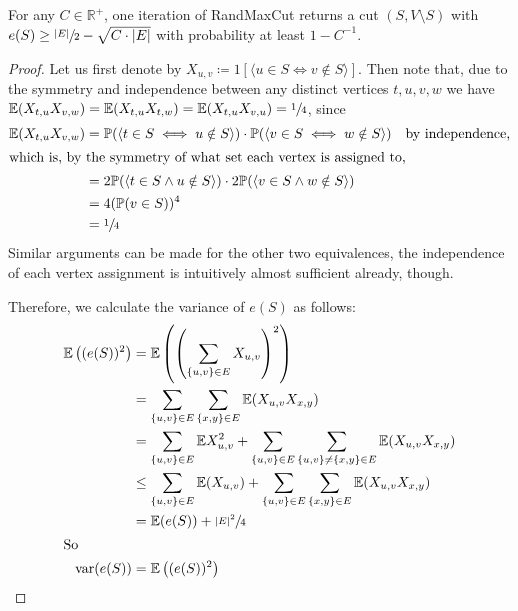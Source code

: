 		\begin{claim}
			For any $C \in \mathbb{R}^+$, one iteration of RandMaxCut returns a cut $(S, V\setminus S)$ with $e(S) \geq 
			\sfrac{|E|}{2} - \sqrt{C\cdot|E|}$ with probability at least $1 - C^{-1}$. 
		\end{claim}
		\begin{proof}
			Let us first denote by $X_{u,v} \coloneqq 1[\langle u \in S \iff v \notin S \rangle]$. Then note that, due 
			to the symmetry and independence between any distinct vertices $t,u,v,w$ we have $\mathbb{E}(X_{t,u}X_{v,w})
			= \mathbb{E}(X_{t,u}X_{t,w}) = \mathbb{E}(X_{t,u}X_{v,u}) = \sfrac{1}{4}$, since 
			\begin{align*}
				\mathbb{E}(X_{t,u}X_{v,w}) &= \mathbb{P}(\langle t \in S \iff u \notin S \rangle) \cdot 
				                           \mathbb{P}(\langle v \in S \iff w \notin S \rangle)&\text{by independence,}\\
						\intertext{which is, by the symmetry of what set each vertex is assigned to,}
							   &= 2 \mathbb{P}(\langle t \in S \land u \notin S \rangle) \cdot 
							   2 \mathbb{P}(\langle v \in S \land w \notin S \rangle)\\
							   &= 4 (\mathbb{P}(v \in S))^4 \\
							   &= \sfrac{1}{4}
			\end{align*}
			Similar arguments can be made for the other two equivalences, the independence of each vertex assignment 
			is intuitively almost sufficient already, though. \par
			Therefore, we calculate the variance of $e(S)$ as follows:
			\begin{align*}
				\mathbb{E}\left((e(S))^2\right) &= \mathbb{E}\left(\left(\sum_{\{u,v\} \in E} X_{u,v}\right)^2\right)\\
				                                &= \sum_{\{u,v\}\in E}\sum_{\{x,y\}\in E}\mathbb{E}(X_{u,v}X_{x,y})
								\\
								&= \sum_{\{u,v\}\in E} \mathbb{E}X_{u,v}^2 + \sum_{\{u,v\}\in E}
								\sum_{\{u,v\}\neq\{x,y\}\in E} \mathbb{E}(X_{u,v}X_{x,y}) \\
								&\leq \sum_{\{u,v\} \in E} \mathbb{E}(X_{u,v}) + \sum_{\{u,v\}\in E}
								\sum_{\{x,y\}\in E} \mathbb{E}(X_{u,v}X_{x,y}) \\
								&= \mathbb{E}(e(S)) + \sfrac{|E|^2}{4} \\
							\intertext{So}
					     \mathrm{var}(e(S)) &= \mathbb{E}\left((e(S))^2\right) \\

\end{align*}
\end{proof}
